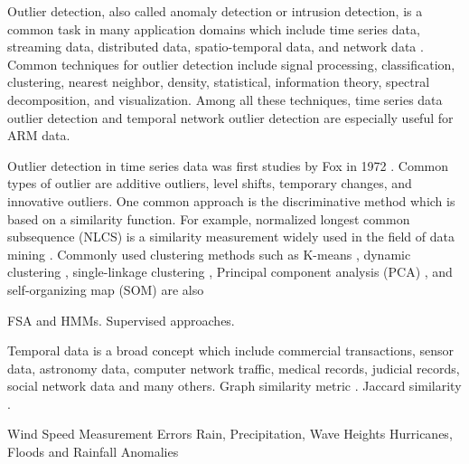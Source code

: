 \documentclass[letterpaper, 10 pt, conference]{ieeeconf}  %
\begin{document}
Outlier detection, also called anomaly detection or intrusion detection, is a common task in many application domains which include time series data, streaming data, distributed data, spatio-temporal data, and network data \cite{gupta2014outlier}. Common techniques for outlier detection include signal processing, classification, clustering, nearest neighbor, density, statistical, information theory, spectral decomposition, and visualization. Among all these techniques, time series data outlier detection and temporal network outlier detection are especially useful for ARM data.

Outlier detection in time series data was first studies by Fox in 1972 \cite{fox1972outliers}. Common types of outlier are additive outliers, level shifts, temporary changes, and innovative outliers. One common approach is the discriminative method which is based on a similarity function. For example, normalized longest common subsequence (NLCS) is a similarity measurement widely used in the field of data mining \cite{budalakoti2009anomaly, chandola2008comparative, sequeira2002admit}. Commonly used clustering methods such as K-means \cite{macqueen1967some}, dynamic clustering \cite{sequeira2002admit}, single-linkage clustering \cite{portnoy2001intrusion}, Principal component analysis (PCA) \cite{gupta2013context}, and self-organizing map (SOM) \cite{gonzalez2003anomaly} are also 

FSA and HMMs. 
Supervised approaches. 

Temporal data is a broad concept which include commercial transactions, sensor data, astronomy data, computer network traffic, medical records, judicial records, social network data and many others. Graph similarity metric \cite{papadimitriou2010web}. Jaccard similarity \cite{jay2012systematic}.

Wind Speed Measurement Errors \cite{hill2007real, hill2010anomaly}
Rain, Precipitation, Wave Heights \cite{kut2006spatio, angiulli2007detecting}
Hurricanes, Floods and Rainfall Anomalies \cite{drosdowsky1993analysis, lu2004wavelet, lasaponara2006use}
\end{document}
